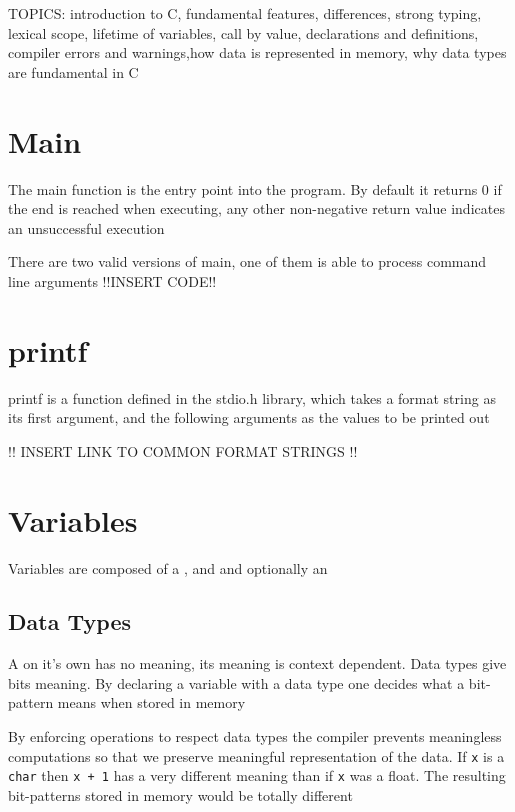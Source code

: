 
\par{TOPICS: introduction to C, fundamental features, differences, strong
typing, lexical scope, lifetime of variables, call by value, declarations and definitions, compiler
errors and warnings,how data is represented in memory, why data types are fundamental in
C}

\section{Main}
\par{The main function is the entry point into the program. By default it returns 0 if the end
is reached when executing, any other non-negative return value indicates an unsuccessful execution}
\par{There are two valid versions of main, one of them is able to process command line
arguments} !!INSERT CODE!!

\section{printf}
\par{printf is a function defined in the stdio.h library, which takes a format string as its
first argument, and the following arguments as the values to be printed out}

!! INSERT LINK TO COMMON FORMAT STRINGS !!


\section{Variables}

\par{Variables are composed of a , and  and optionally an
}


\subsection{Data Types}

\par{A  on it's own has no meaning, its meaning is context dependent. Data
types give bits meaning. By declaring a variable with a data type one decides what a bit-pattern
means when stored in memory}
\par{By enforcing operations to respect data types the compiler prevents meaningless
computations so that we preserve meaningful representation of the data. If \texttt{x} is a
\texttt{char} then \texttt{x + 1} has a very different meaning than if \texttt{x} was a float. The
resulting bit-patterns stored in memory would be totally different}


